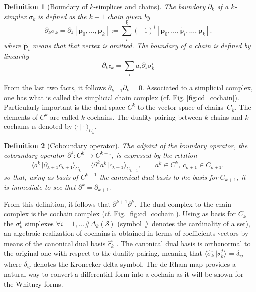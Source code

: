 \documentclass{elsarticle}
\newtheorem{definition}{Definition}
\newcommand*{\dual}[1]{\ensuremath{\widehat{#1}}}
\newcommand{\dualpr}[3][]{\ensuremath{\langle #2 \, \vert #3 \rangle_{#1}}}
\begin{document}
\begin{definition}[Boundary of $k$-simplices and chains]
The boundary $\partial_k$ of a $k$-simplex $\sigma_k$ is  defined as the $k-1$ chain given by
\begin{equation}
    \partial_k\sigma_k = \partial_k [\mathbf{p}_0, \dots, \mathbf{p}_k] := \sum_i^k (-1)^i [\mathbf{p}_0, \dots, \widetilde{\mathbf{p}}_{i},  \dots,\mathbf{p}_k].
\end{equation}
where $\widetilde{\mathbf{p}}_{i}$ means that that vertex is omitted. The boundary of a chain is defined by linearity
\begin{equation}
    \partial_k c_k = \sum_i a_i \partial_k \sigma_k^i
\end{equation}
\end{definition}
From the last two facts, it follows $\partial_{k-1}\partial_k=0$. Associated to a simplicial complex, one has what is called
the simplicial chain complex (cf. Fig. \ref{fig:cd_cochain}).
Particularly important is the dual space $C^k$ to the vector space of chains~$C_k$. The elements of $C^k$ are called $k$-cochains. The duality pairing between $k$-chains and $k$-cochains is denoted by $\dualpr[C_k]{\cdot}{\cdot}$.
\begin{definition}[Coboundary operator]
The adjoint of the boundary operator, the coboundary operator $\partial^k : C^k \rightarrow C^{k+1}$, is expressed by the relation
\begin{equation}
    \dualpr[C_k]{a^k}{\partial_{k+1} c_{k+1}} = \dualpr[C_{k+1}]{\partial^k a^k}{c_{k+1}}, \qquad a^k \in C^k, \; c_{k+1} \in C_{k+1},
\end{equation}
so that, using as basis of $C^{k+1}$ the canonical dual basis to the basis for $C_{k+1}$, it is immediate to see that $\partial^k = \partial_{k+1}^{\top}$.
\end{definition}
From this definition, it follows that $\partial^{k+1}\partial^{k}$. The dual complex to the chain complex is the cochain complex (cf. Fig. \ref{fig:cd_cochain}). Using as basis  for $C_k$ the $\sigma_k^i$ simplexes $\forall i=1, \dots \# \Delta_k(\mathcal{S})$ (symbol $\#$ denotes the cardinality of a set), an algebraic realization of cochains is obtained in terms of coefficients vectors by means of the canonical dual basis $\dual{\sigma}_k^i$ \cite{bochev2006,hiemstra2014}. The canonical dual basis is orthonormal to the original one with respect to the duality pairing, meaning that $\dualpr{\dual{\sigma}_k^i}{\sigma_k^j}=\delta_{ij}$ where $\delta_{ij}$ denotes the Kronecker delta symbol. The de Rham map provides a natural way to convert a differential form into a cochain as it will be shown for the Whitney forms.
\end{document}
